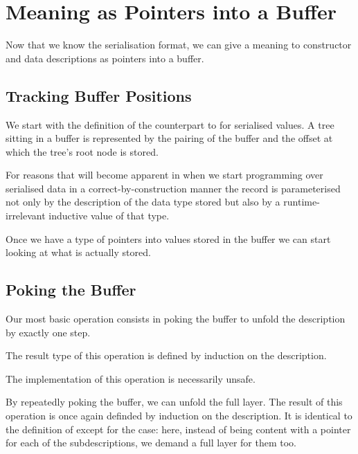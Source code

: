 \section{Meaning as Pointers into a Buffer}\label{sec:pointers}

Now that we know the serialisation format, we can give a meaning
to constructor and data descriptions as pointers into a buffer.

\subsection{Tracking Buffer Positions}

We start with the definition of the counterpart to 
for serialised values. A tree sitting in a buffer is represented
by the pairing of the buffer and the offset at which the tree's
root node is stored.


For reasons that will become apparent in 
when we start programming over serialised data in a correct-by-construction
manner the record  is parameterised not only by the description
of the data type stored but also by a runtime-irrelevant inductive value of
that type.




Once we have a type of pointers into values stored in the buffer
we can start looking at what is actually stored.

\subsection{Poking the Buffer}

Our most basic operation consists in poking the buffer to unfold
the description by exactly one step.


The result type of this operation is defined by induction on the
description.



The implementation of this operation is necessarily unsafe.


By repeatedly poking the buffer, we can unfold the full layer.
The result of this operation is once again definded by induction
on the description. It is identical to the definition of
 except for the  case:
here, instead of being content with a pointer for each of the
subdescriptions, we demand a full layer for them too.

